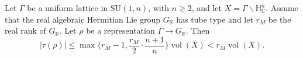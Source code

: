 \begin{propositionC}
Let $\Gamma$ be a uniform lattice in $\mathrm{SU}(1,n)$, with $n\geqslant2$, and let $X=\Gamma\backslash\mathbb H^n_{\mathbb C}$. Assume that the real algebraic Hermitian Lie group $G_{\mathbb R}$ has tube type and let $r_M$ be the real rank of $G_{\mathbb R}$. Let $\rho$ be a representation $\Gamma\to G_{\mathbb R}$. Then
\[
|\tau(\rho)|\leqslant\max\Big\{r_M-1,\frac{r_M}{2}\cdot\frac{n+1}{n}\Big\}\operatorname{vol}(X)<r_M\operatorname{vol}(X).
\]
\end{propositionC}
